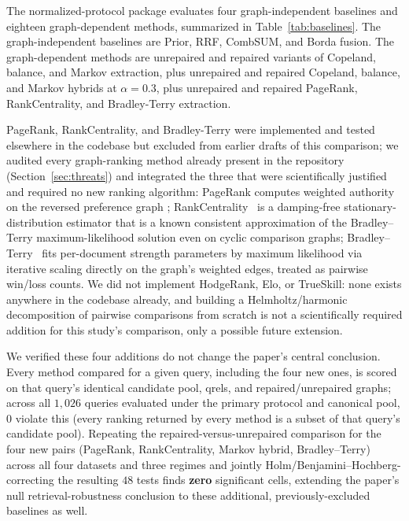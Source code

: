 \documentclass[manuscript,anonymous,review]{acmart}
\begin{document}
The normalized-protocol package evaluates four graph-independent baselines and
eighteen graph-dependent methods, summarized in Table~\ref{tab:baselines}. The
graph-independent baselines are Prior, RRF, CombSUM, and Borda fusion. The
graph-dependent methods are unrepaired and repaired variants of Copeland,
balance, and Markov extraction, plus unrepaired and repaired Copeland, balance,
and Markov hybrids at $\alpha=0.3$, plus unrepaired and repaired PageRank,
RankCentrality, and Bradley-Terry extraction.

PageRank, RankCentrality, and Bradley-Terry were implemented and tested
elsewhere in the codebase but excluded from earlier drafts of this
comparison; we audited every graph-ranking method already present in the
repository (Section~\ref{sec:threats}) and integrated the three that were
scientifically justified and required no new ranking algorithm: PageRank
computes weighted authority on the reversed preference graph
\cite{page1999pagerank}; RankCentrality~\cite{negahban2017rankcentrality} is a
damping-free stationary-distribution estimator that is a known consistent
approximation of the Bradley--Terry maximum-likelihood solution even on
cyclic comparison graphs; Bradley--Terry~\cite{bradley1952rank} fits
per-document strength parameters by maximum likelihood via iterative
scaling directly on the graph's weighted edges, treated as pairwise win/loss
counts. We did not implement HodgeRank, Elo, or TrueSkill: none exists
anywhere in the codebase already, and building a Helmholtz/harmonic
decomposition of pairwise comparisons from scratch is not a scientifically
required addition for this study's comparison, only a possible future
extension.

We verified these four additions do not change the paper's central
conclusion. Every method compared for a given query, including the four
new ones, is scored on that query's identical candidate pool, qrels, and
repaired/unrepaired graphs; across all $1{,}026$ queries evaluated under the
primary protocol and canonical pool, $0$ violate this (every ranking
returned by every method is a subset of that query's candidate pool).
Repeating the repaired-versus-unrepaired comparison for the four new pairs
(PageRank, RankCentrality, Markov hybrid, Bradley--Terry) across all four
datasets and three regimes and jointly Holm/Benjamini--Hochberg-correcting
the resulting $48$ tests finds \textbf{zero} significant cells, extending
the paper's null retrieval-robustness conclusion to these additional,
previously-excluded baselines as well.
\end{document}
